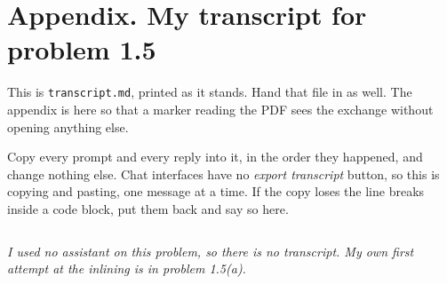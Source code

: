 \documentclass[11pt]{article}
\begin{document}
\clearpage
\section*{Appendix. My transcript for problem 1.5}

\noindent
This is \texttt{transcript.md}, printed as it stands. Hand that file in as
well. The appendix is here so that a marker reading the PDF sees the exchange
without opening anything else.

\medskip
\noindent
Copy every prompt and every reply into it, in the order they happened, and
change nothing else. Chat interfaces have no \emph{export transcript} button,
so this is copying and pasting, one message at a time. If the copy loses the
line breaks inside a code block, put them back and say so here.

\bigskip
%
\begingroup{}\selectfont

%
  {\inputminted[breaklines, fontsize=\scriptsize, baselinestretch=0.9,
     linenos=false]{markdown}{transcript.md}}%
  {\color{solution}\emph{I used no assistant on this problem, so there is no
     transcript. My own first attempt at the inlining is in problem 1.5(a).
  }}
\endgroup
\end{document}
